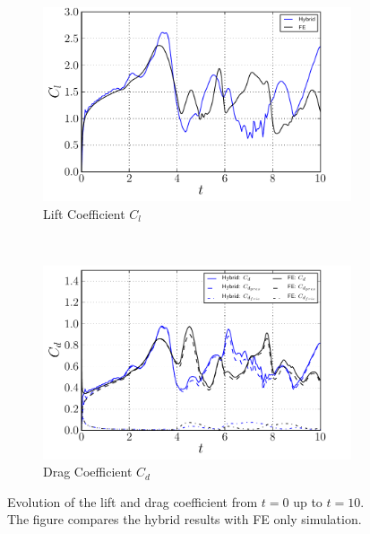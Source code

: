	\begin{figure}[!p]
     \centering
     \begin{subfigure}[t]{0.49\textwidth}
             \includegraphics[width=\textwidth]{./figures/validation/ellipse/hybrid_ellipseForce_CL.pdf}
             \caption{Lift Coefficient $C_l$}
             \label{fig:hybrid_ellipseForce_CL}
     \end{subfigure}%
     ~ %
     \begin{subfigure}[t]{0.49\textwidth}
             \includegraphics[width=\textwidth]{./figures/validation/ellipse/hybrid_ellipseForce_CD.pdf}
             \caption{Drag Coefficient $C_d$}
             \label{fig:hybrid_ellipseForce_CD}
     \end{subfigure}
     \caption{Evolution of the lift and drag coefficient from $t=0$ up to $t=10$. The figure compares the hybrid results with FE only simulation.}
     \label{fig:hybrid_ellipseForce}
	\end{figure}	


